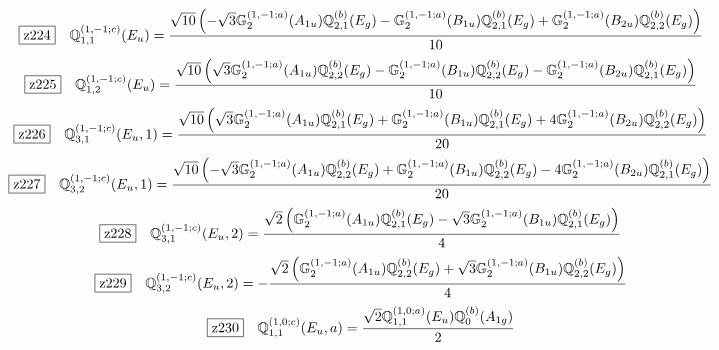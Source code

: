 \documentclass[fleqn,10pt,landscape]{jsarticle}
\begin{document}
\begin{dmath*}
\hspace*{3mm}\fbox{z224}\quad \mathbb{Q}_{1,1}^{(1,-1;c)}(E_{u})=\frac{\sqrt{10} \left(- \sqrt{3} \mathbb{G}_{2}^{(1,-1;a)}(A_{1u}) \mathbb{Q}_{2,1}^{(b)}(E_{g}) - \mathbb{G}_{2}^{(1,-1;a)}(B_{1u}) \mathbb{Q}_{2,1}^{(b)}(E_{g}) + \mathbb{G}_{2}^{(1,-1;a)}(B_{2u}) \mathbb{Q}_{2,2}^{(b)}(E_{g})\right)}{10}
\end{dmath*}
\begin{dmath*}
\hspace*{3mm}\fbox{z225}\quad \mathbb{Q}_{1,2}^{(1,-1;c)}(E_{u})=\frac{\sqrt{10} \left(\sqrt{3} \mathbb{G}_{2}^{(1,-1;a)}(A_{1u}) \mathbb{Q}_{2,2}^{(b)}(E_{g}) - \mathbb{G}_{2}^{(1,-1;a)}(B_{1u}) \mathbb{Q}_{2,2}^{(b)}(E_{g}) - \mathbb{G}_{2}^{(1,-1;a)}(B_{2u}) \mathbb{Q}_{2,1}^{(b)}(E_{g})\right)}{10}
\end{dmath*}
\begin{dmath*}
\hspace*{3mm}\fbox{z226}\quad \mathbb{Q}_{3,1}^{(1,-1;c)}(E_{u},1)=\frac{\sqrt{10} \left(\sqrt{3} \mathbb{G}_{2}^{(1,-1;a)}(A_{1u}) \mathbb{Q}_{2,1}^{(b)}(E_{g}) + \mathbb{G}_{2}^{(1,-1;a)}(B_{1u}) \mathbb{Q}_{2,1}^{(b)}(E_{g}) + 4 \mathbb{G}_{2}^{(1,-1;a)}(B_{2u}) \mathbb{Q}_{2,2}^{(b)}(E_{g})\right)}{20}
\end{dmath*}
\begin{dmath*}
\hspace*{3mm}\fbox{z227}\quad \mathbb{Q}_{3,2}^{(1,-1;c)}(E_{u},1)=\frac{\sqrt{10} \left(- \sqrt{3} \mathbb{G}_{2}^{(1,-1;a)}(A_{1u}) \mathbb{Q}_{2,2}^{(b)}(E_{g}) + \mathbb{G}_{2}^{(1,-1;a)}(B_{1u}) \mathbb{Q}_{2,2}^{(b)}(E_{g}) - 4 \mathbb{G}_{2}^{(1,-1;a)}(B_{2u}) \mathbb{Q}_{2,1}^{(b)}(E_{g})\right)}{20}
\end{dmath*}
\begin{dmath*}
\hspace*{3mm}\fbox{z228}\quad \mathbb{Q}_{3,1}^{(1,-1;c)}(E_{u},2)=\frac{\sqrt{2} \left(\mathbb{G}_{2}^{(1,-1;a)}(A_{1u}) \mathbb{Q}_{2,1}^{(b)}(E_{g}) - \sqrt{3} \mathbb{G}_{2}^{(1,-1;a)}(B_{1u}) \mathbb{Q}_{2,1}^{(b)}(E_{g})\right)}{4}
\end{dmath*}
\begin{dmath*}
\hspace*{3mm}\fbox{z229}\quad \mathbb{Q}_{3,2}^{(1,-1;c)}(E_{u},2)=- \frac{\sqrt{2} \left(\mathbb{G}_{2}^{(1,-1;a)}(A_{1u}) \mathbb{Q}_{2,2}^{(b)}(E_{g}) + \sqrt{3} \mathbb{G}_{2}^{(1,-1;a)}(B_{1u}) \mathbb{Q}_{2,2}^{(b)}(E_{g})\right)}{4}
\end{dmath*}
\begin{dmath*}
\hspace*{3mm}\fbox{z230}\quad \mathbb{Q}_{1,1}^{(1,0;c)}(E_{u},a)=\frac{\sqrt{2} \mathbb{Q}_{1,1}^{(1,0;a)}(E_{u}) \mathbb{Q}_{0}^{(b)}(A_{1g})}{2}
\end{dmath*}
\end{document}
